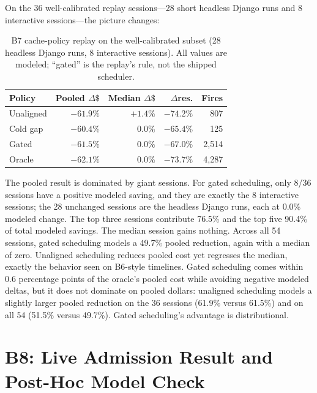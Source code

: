 \documentclass[10pt,twocolumn]{article}
\begin{document}
On the 36 well-calibrated replay sessions---28 short headless Django runs and 8 interactive
sessions---the picture changes:

\begin{table}[h]
\centering
\caption{B7 cache-policy replay on the well-calibrated subset (28 headless Django runs, 8 interactive
sessions).  All values are modeled; ``gated'' is the replay's rule, not the shipped scheduler.}
\label{tab:b7}
\small
\begin{tabular}{lrrrr}
\toprule
Policy & Pooled $\Delta\$$ & Median $\Delta\$$ & $\Delta$res. & Fires \\
\midrule
Unaligned & $-61.9\%$ & $+1.4\%$ & $-74.2\%$ & 807 \\
Cold gap & $-60.4\%$ & $0.0\%$ & $-65.4\%$ & 125 \\
Gated & $-61.5\%$ & $0.0\%$ & $-67.0\%$ & 2,514 \\
Oracle & $-62.1\%$ & $0.0\%$ & $-73.7\%$ & 4,287 \\
\bottomrule
\end{tabular}
\end{table}

The pooled result is dominated by giant sessions.  For gated scheduling, only 8/36 sessions have a
positive modeled saving, and they are exactly the 8 interactive sessions; the 28 unchanged sessions are
the headless Django runs, each at 0.0\% modeled change.  The top three sessions contribute 76.5\% and
the top five 90.4\% of total modeled savings.  The median session gains nothing.  Across all 54
sessions, gated scheduling models a 49.7\% pooled reduction, again with a median of zero.  Unaligned
scheduling reduces pooled cost yet regresses the median, exactly the behavior seen on B6-style
timelines.  Gated scheduling comes within 0.6 percentage points of the oracle's pooled cost while
avoiding negative modeled deltas, but it does not dominate on pooled dollars: unaligned scheduling
models a slightly larger pooled reduction on the 36 sessions (61.9\% versus 61.5\%) and on all 54
(51.5\% versus 49.7\%).  Gated scheduling's advantage is distributional.


\section{B8: Live Admission Result and Post-Hoc Model Check}
\end{document}
